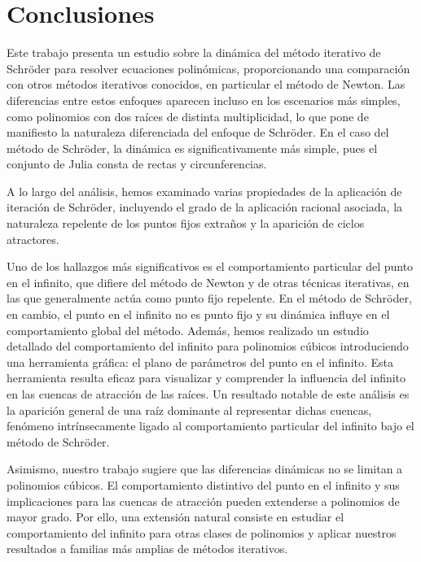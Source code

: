 \IfFileExists{aims.cls}{\documentclass{aims}}{\documentclass[11pt]{article}}
\numberwithin{equation}{section}
\theoremstyle{thmstyleone}%
\theoremstyle{thmstyletwo}%
\theoremstyle{thmstylethree}%
\begin{document}
\section{Conclusiones}




Este trabajo presenta un estudio sobre la dinámica del método iterativo de Schröder para resolver ecuaciones polinómicas, proporcionando una comparación con otros métodos iterativos conocidos, en particular el método de Newton. Las diferencias entre estos enfoques aparecen incluso en los escenarios más simples, como polinomios con dos raíces de distinta multiplicidad, lo que pone de manifiesto la naturaleza diferenciada del enfoque de Schröder. En el caso del método de Schröder, la dinámica es significativamente más simple, pues el conjunto de Julia consta de rectas y circunferencias.

A lo largo del análisis, hemos examinado varias propiedades de la aplicación de iteración de Schröder, incluyendo el grado de la aplicación racional asociada, la naturaleza repelente de los puntos fijos extraños y la aparición de ciclos atractores.

Uno de los hallazgos más significativos es el comportamiento particular del punto en el infinito, que difiere del método de Newton y de otras técnicas iterativas, en las que generalmente actúa como punto fijo repelente. En el método de Schröder, en cambio, el punto en el infinito no es punto fijo y su dinámica influye en el comportamiento global del método. Además, hemos realizado un estudio detallado del comportamiento del infinito para polinomios cúbicos introduciendo una herramienta gráfica: el plano de parámetros del punto en el infinito. Esta herramienta resulta eficaz para visualizar y comprender la influencia del infinito en las cuencas de atracción de las raíces. Un resultado notable de este análisis es la aparición general de una raíz dominante al representar dichas cuencas, fenómeno intrínsecamente ligado al comportamiento particular del infinito bajo el método de Schröder.


Asimismo, nuestro trabajo sugiere que las diferencias dinámicas no se limitan a polinomios cúbicos. El comportamiento distintivo del punto en el infinito y sus implicaciones para las cuencas de atracción pueden extenderse a polinomios de mayor grado. Por ello, una extensión natural consiste en estudiar el comportamiento del infinito para otras clases de polinomios y aplicar nuestros resultados a familias más amplias de métodos iterativos.
\end{document}
